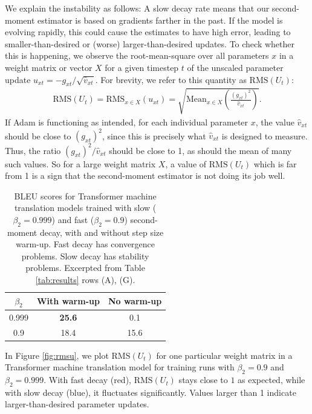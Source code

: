 \documentclass{article}
\begin{document}
We explain the instability as follows: A slow decay rate means that our second-moment estimator is based on gradients farther in the past.  If the model is evolving rapidly, this could cause the estimates to have high error, leading to smaller-than-desired or (worse) larger-than-desired updates.  To check whether this is happening, we observe the root-mean-square over all parameters $x$ in a weight matrix or vector $X$ for a given timestep $t$ of the unscaled parameter update $u_{xt} = -g_{xt} / \sqrt{\hat{v}_{xt}}$.  For brevity, we refer to this quantity as $\mathrm{RMS}(U_t)$:
%
\begin{equation*} %
\begin{split}
\mathrm{RMS}(U_t) = \mathrm{RMS}_{x \in X}(u_{xt}) = \sqrt{\mathrm{Mean}_{x \in X}\left(\frac{(g_{xt})^2}{\hat{v}_{xt}}\right)} .
\end{split}
\end{equation*}
%
If Adam is functioning as intended, for each individual parameter $x$, the value $\hat{v}_{xt}$ should be close to $(g_{xt})^2$, since this is precisely what $\hat{v}_{xt}$ is designed to measure.  Thus, the ratio $(g_{xt})^2 / \hat{v}_{xt}$ should be close to 1, as should the mean of many such values.  So for a large weight matrix $X$, a value of $\mathrm{RMS}(U_t)$ which is far from 1 is a sign that the second-moment estimator is not doing its job well.

\begin{table}[t]
\caption{BLEU scores for Transformer machine translation models trained with slow ($\beta_2=0.999$) and fast ($\beta_2=0.9$) second-moment decay, with and without step size warm-up. Fast decay has convergence problems. Slow decay has stability problems.  Excerpted from Table \ref{tab:results} rows (A), (G).}
\label{tab:slowfast}
\vskip 0.15in
\begin{center}
\begin{small}
\begin{tabular}{c|cc}
\toprule
$\beta_2$ & With warm-up & No warm-up \\
\midrule
0.999  & \textbf{25.6} &  0.1\\
0.9  & 18.4  &  15.6 \\
\bottomrule
\end{tabular}
\end{small}
\end{center}
\vskip -0.1in
\end{table}


In Figure \ref{fig:rmsu}, we plot $\mathrm{RMS}(U_t)$ for one particular weight matrix in a Transformer machine translation model \cite{Vaswani17Attention} for training runs with $\beta_2=0.9$ and $\beta_2=0.999$.  With fast decay (red), $\mathrm{RMS}(U_t)$ stays close to $1$ as expected, while with slow decay (blue), it fluctuates significantly.  Values larger than 1 indicate larger-than-desired parameter updates.
\end{document}
